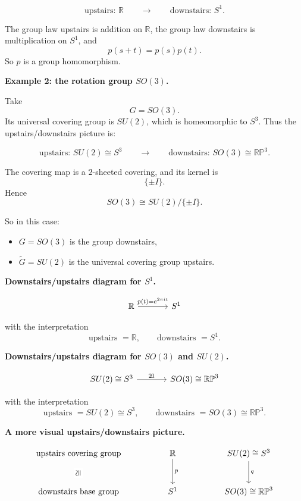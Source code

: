 \documentclass[12pt,a4paper]{article}
\theoremstyle{notespace}
\begin{document}
\[
\text{upstairs: } \mathbb R
\qquad\longrightarrow\qquad
\text{downstairs: } S^1.
\]

The group law upstairs is addition on \(\mathbb R\), the group law downstairs is multiplication on \(S^1\), and
\[
p(s+t)=p(s)p(t).
\]
So \(p\) is a group homomorphism.

\medskip

\textbf{Example 2: the rotation group \(SO(3)\).}

Take
\[
G=SO(3).
\]
Its universal covering group is \(SU(2)\), which is homeomorphic to \(S^3\). Thus the upstairs/downstairs picture is:

\[
\text{upstairs: } SU(2)\cong S^3
\qquad\longrightarrow\qquad
\text{downstairs: } SO(3)\cong \mathbb{RP}^3.
\]

The covering map is a \(2\)-sheeted covering, and its kernel is
\[
\{\pm I\}.
\]
Hence
\[
SO(3)\cong SU(2)/\{\pm I\}.
\]

So in this case:

\begin{itemize}
	\item \(G=SO(3)\) is the group downstairs,
	\item \(\widetilde{G}=SU(2)\) is the universal covering group upstairs.
\end{itemize}

\medskip

\textbf{Downstairs/upstairs diagram for \(S^1\).}

\[
\begin{tikzcd}[column sep=large]
	\mathbb R \arrow[r,"p(t)=e^{2\pi i t}"] & S^1
\end{tikzcd}
\]

with the interpretation
\[
\text{upstairs }=\mathbb R,
\qquad
\text{downstairs }=S^1.
\]

\medskip

\textbf{Downstairs/upstairs diagram for \(SO(3)\) and \(SU(2)\).}

\[
\begin{tikzcd}[column sep=large]
	SU(2)\cong S^3 \arrow[r,"2\!:\!1"] & SO(3)\cong \mathbb{RP}^3
\end{tikzcd}
\]

with the interpretation
\[
\text{upstairs }=SU(2)\cong S^3,
\qquad
\text{downstairs }=SO(3)\cong \mathbb{RP}^3.
\]

\medskip

\textbf{A more visual upstairs/downstairs picture.}

\[
\begin{tikzcd}[row sep=large, column sep=huge]
	\text{upstairs covering group} \arrow[d, phantom, "\rotatebox{90}{\(\cong\)}" description] &
	\mathbb R \arrow[d,"p"] &
	SU(2)\cong S^3 \arrow[d,"q"] \\
	\text{downstairs base group} &
	S^1 &
	SO(3)\cong \mathbb{RP}^3
\end{tikzcd}
\]
\end{document}
